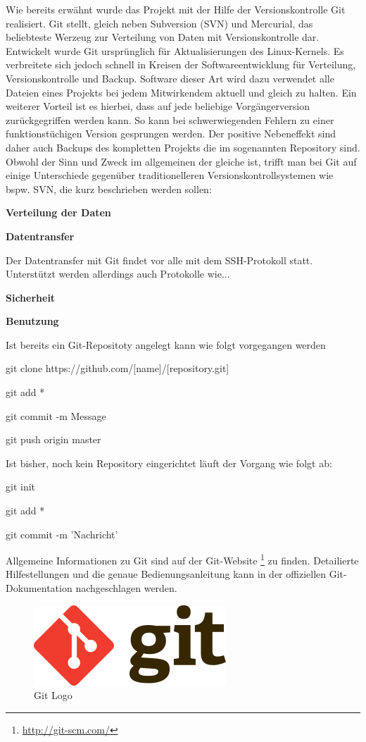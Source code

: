 \documentclass[12pt, twoside, a4paper, ngerman]{article}
\newcommand{\iz}[2]{#1 {\renewcommand{\baselinestretch}{1}\footnote{#2}}} %
\renewcommand{\baselinestretch}{1.5}
\begin{document}
Wie bereits erwähnt wurde das Projekt mit der Hilfe der Versionskontrolle Git realisiert. Git stellt, gleich neben \gls{Subversion} (SVN) und \gls{Mercurial}, das beliebteste Werzeug zur Verteilung von Daten mit Versionskontrolle dar.
Entwickelt wurde Git ursprünglich für Aktualisierungen des Linux-Kernels. Es verbreitete sich jedoch schnell in Kreisen der Softwareentwicklung für Verteilung, Versionskontrolle und Backup.
Software dieser Art wird dazu verwendet alle Dateien eines Projekts bei jedem Mitwirkendem aktuell und gleich zu halten. Ein weiterer Vorteil ist es hierbei, dass auf jede beliebige Vorgängerversion zurückgegriffen werden kann. So kann bei schwerwiegenden Fehlern zu einer funktionstüchigen Version gesprungen werden. Der positive Nebeneffekt sind daher auch Backups des kompletten Projekts die im sogenannten Repository sind. 
Obwohl der Sinn und Zweck im allgemeinen der gleiche ist, trifft man bei Git auf einige Unterschiede gegenüber traditionelleren Versionskontrollsystemen wie bspw. SVN, die kurz beschrieben werden sollen:

\textbf{Verteilung der Daten}

\textbf{Datentransfer}

Der Datentransfer mit Git findet vor alle mit dem SSH-Protokoll statt. Unterstützt werden allerdings auch Protokolle wie...

\textbf{Sicherheit}

\textbf{Benutzung}

Ist bereits ein Git-Repositoty angelegt kann wie folgt vorgegangen werden
   
git clone https://github.com/[name]/[repository.git]

git add * 

git commit -m Message

git push origin master

Ist bisher, noch kein Repository eingerichtet läuft der Vorgang wie folgt ab:
   
git init

git add * 

git commit -m 'Nachricht'
   
Allgemeine Informationen zu Git sind auf der \iz{Git-Website}{\url{http://git-scm.com/}} zu finden. Detailierte Hilfestellungen und die genaue Bedienungsanleitung kann in der offiziellen Git-Dokumentation \cite{GitDoku} nachgeschlagen werden. 
   

\begin{figure}
 \begin{center}
   \includegraphics[scale=0.5]{img/git_logo.png}
 \end{center}
 \caption[\textbf{Git Logo \url{http://upload.wikimedia.org/wikipedia/commons/thumb/e/e0/Git-logo.svg/273px-Git-logo.svg.png}}]{Git Logo}
 \label{fig:git_logo}
\end{figure}
\end{document}
